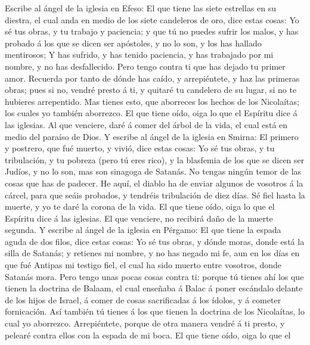  Escribe al ángel de la iglesia en Efeso: El que tiene las
siete estrellas en su diestra, el cual anda en medio de los siete
candeleros de oro, dice estas cosas:  Yo sé tus obras, y
tu trabajo y paciencia; y que tú no puedes sufrir los malos, y has
probado á los que se dicen ser apóstoles, y no lo son, y los has hallado
mentirosos;  Y has sufrido, y has tenido paciencia, y has
trabajado por mi nombre, y no has desfallecido.  Pero
tengo contra ti que has dejado tu primer amor.  Recuerda
por tanto de dónde has caído, y arrepiéntete, y haz las primeras obras;
pues si no, vendré presto á ti, y quitaré tu candelero de su lugar, si
no te hubieres arrepentido.  Mas tienes esto, que
aborreces los hechos de los Nicolaítas; los cuales yo también aborrezco.
 El que tiene oído, oiga lo que el Espíritu dice á las
iglesias. Al que venciere, daré á comer del árbol de la vida, el cual
está en medio del paraíso de Dios.  Y escribe al ángel de
la iglesia en Smirna: El primero y postrero, que fué muerto, y vivió,
dice estas cosas:  Yo sé tus obras, y tu tribulación, y tu
pobreza (pero tú eres rico), y la blasfemia de los que se dicen ser
Judíos, y no lo son, mas son sinagoga de Satanás.  No
tengas ningún temor de las cosas que has de padecer. He aquí, el diablo
ha de enviar algunos de vosotros á la cárcel, para que seáis probados, y
tendréis tribulación de diez días. Sé fiel hasta la muerte, y yo te daré
la corona de la vida.  El que tiene oído, oiga lo que el
Espíritu dice á las iglesias. El que venciere, no recibirá daño de la
muerte segunda.  Y escribe al ángel de la iglesia en
Pérgamo: El que tiene la espada aguda de dos filos, dice estas cosas:
 Yo sé tus obras, y dónde moras, donde está la silla de
Satanás; y retienes mi nombre, y no has negado mi fe, aun en los días en
que fué Antipas mi testigo fiel, el cual ha sido muerto entre vosotros,
donde Satanás mora.  Pero tengo unas pocas cosas contra
ti: porque tú tienes ahí los que tienen la doctrina de Balaam, el cual
enseñaba á Balac á poner escándalo delante de los hijos de Israel, á
comer de cosas sacrificadas á los ídolos, y á cometer fornicación.
 Así también tú tienes á los que tienen la doctrina de
los Nicolaítas, lo cual yo aborrezco.  Arrepiéntete,
porque de otra manera vendré á ti presto, y pelearé contra ellos con la
espada de mi boca.  El que tiene oído, oiga lo que el
